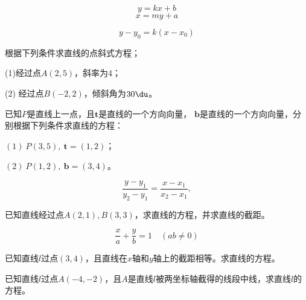 \begin{definition}[直线的斜截式方程]
    \begin{equation}
        y=kx+b
    \end{equation}
    \begin{equation}
        x=my+a
    \end{equation}
\end{definition}


\begin{definition}[直线的点斜式方程]
    \begin{equation}
        y-y_0=k(x-x_0)
    \end{equation}
\end{definition}
\begin{example}
    根据下列条件求直线的点斜式方程；
    
    (1)经过点$A(2,5)$，斜率为$4$；

(2) 经过点$B(-2,2)$，倾斜角为\(30\du \)。
\end{example}

\begin{example}
    已知$P$是直线上一点，且\(\mathbf{t}\)是直线的一个方向向量，
    \(\mathbf{b}\)是直线的一个方向向量，分别根据下列条件求直线的方程：

$(1)\ P(3,5),\ \mathbf{t}=(1,2)$；      

$(2)\ P(1,2),\ \mathbf{b}=(3,4)$。
\end{example}




\begin{definition}[直线的两点式方程]
    
    \begin{equation}
        \frac{y-y_{1}}{y_{2}-y_{1}}=\frac{x-x_{1}}{x_{2}-x_{1}},
    \end{equation}
\end{definition}

\begin{example}
    已知直线经过点$A(2,1),B(3,3)$，求直线的方程，并求直线的截距。
\end{example}
\begin{definition}[直线的截距式方程]
    \begin{equation}
        \frac{x}{a}+\frac{y}{b}=1\quad (ab\neq 0)
    \end{equation}
\end{definition}

\begin{example}
    已知直线\(l\)过点\((3,4)\)，且直线在\(x\)轴和\(y\)轴上的截距相等。求直线的方程。
\end{example}
\begin{exercise}
    已知直线\(l\)过点\(A(-4,-2)\)，且\(A\)是直线\(l\)被两坐标轴截得的线段中线，求直线\(l\)的方程。
\end{exercise}

